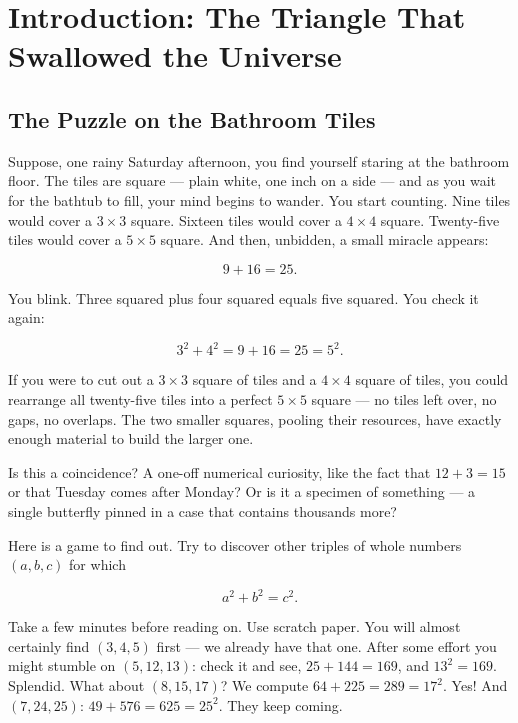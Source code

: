 \chapter*{Introduction: The Triangle That Swallowed the Universe}



\section{The Puzzle on the Bathroom Tiles}


Suppose, one rainy Saturday afternoon, you find yourself staring at the bathroom floor. The tiles are square --- plain white, one inch on a side --- and as you wait for the bathtub to fill, your mind begins to wander. You start counting. Nine tiles would cover a $3 \times 3$ square. Sixteen tiles would cover a $4 \times 4$ square. Twenty-five tiles would cover a $5 \times 5$ square. And then, unbidden, a small miracle appears:

\[
9 + 16 = 25.
\]

You blink. Three squared plus four squared equals five squared. You check it again:

\[
3^2 + 4^2 = 9 + 16 = 25 = 5^2.
\]

If you were to cut out a $3 \times 3$ square of tiles and a $4 \times 4$ square of tiles, you could rearrange all twenty-five tiles into a perfect $5 \times 5$ square --- no tiles left over, no gaps, no overlaps. The two smaller squares, pooling their resources, have exactly enough material to build the larger one.

Is this a coincidence? A one-off numerical curiosity, like the fact that $12 + 3 = 15$ or that Tuesday comes after Monday? Or is it a specimen of something --- a single butterfly pinned in a case that contains thousands more?

Here is a game to find out. Try to discover other triples of whole numbers $(a, b, c)$ for which

\[
a^2 + b^2 = c^2.
\]

Take a few minutes before reading on. Use scratch paper. You will almost certainly find $(3, 4, 5)$ first --- we already have that one. After some effort you might stumble on $(5, 12, 13)$: check it and see, $25 + 144 = 169$, and $13^2 = 169$. Splendid. What about $(8, 15, 17)$? We compute $64 + 225 = 289 = 17^2$. Yes! And $(7, 24, 25)$: $49 + 576 = 625 = 25^2$. They keep coming.


